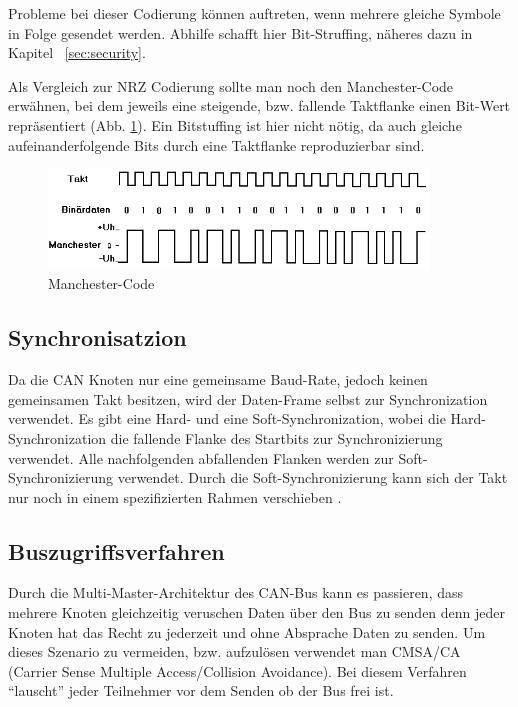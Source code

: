 Probleme bei dieser Codierung können auftreten, wenn mehrere gleiche Symbole in Folge
gesendet werden. Abhilfe schafft hier Bit-Struffing, näheres dazu in Kapitel ~\ref{sec:security}.

Als Vergleich zur NRZ Codierung sollte man noch den Manchester-Code erwähnen, bei dem
jeweils eine steigende, bzw. fallende Taktflanke einen Bit-Wert repräsentiert (Abb. \ref{mancode}).
Ein Bitstuffing ist hier nicht nötig, da auch gleiche aufeinanderfolgende Bits durch eine Taktflanke 
reproduzierbar sind.

\begin{figure}[h] 
\centering
\includegraphics[width=0.9\textwidth]{figures/mancode}
\caption{Manchester-Code \citep{MAN}} 
\label{mancode}
\end{figure} 
	
\subsection{Synchronisatzion}

Da die CAN Knoten nur eine gemeinsame Baud-Rate, jedoch keinen gemeinsamen Takt besitzen, 
wird der Daten-Frame selbst zur Synchronization verwendet. Es gibt eine Hard- und eine Soft-Synchronization,
wobei die Hard-Synchronization die fallende Flanke des Startbits zur Synchronizierung verwendet. Alle 
nachfolgenden abfallenden Flanken werden zur Soft-Synchronizierung verwendet. Durch die Soft-Synchronizierung
kann sich der Takt nur noch in einem spezifizierten Rahmen verschieben \citep[nach][]{BSY}.
	
\subsection{Buszugriffsverfahren}
\label{sec:access}

Durch die Multi-Master-Architektur des CAN-Bus kann es passieren, dass mehrere Knoten gleichzeitig veruschen
Daten über den Bus zu senden denn jeder Knoten hat das Recht zu jederzeit und ohne Absprache Daten zu senden.
Um dieses Szenario zu vermeiden, bzw. aufzulösen verwendet man CMSA/CA (Carrier Sense Multiple 
Access/Collision Avoidance). Bei diesem Verfahren ``lauscht'' jeder Teilnehmer vor dem Senden ob der Bus frei ist.

